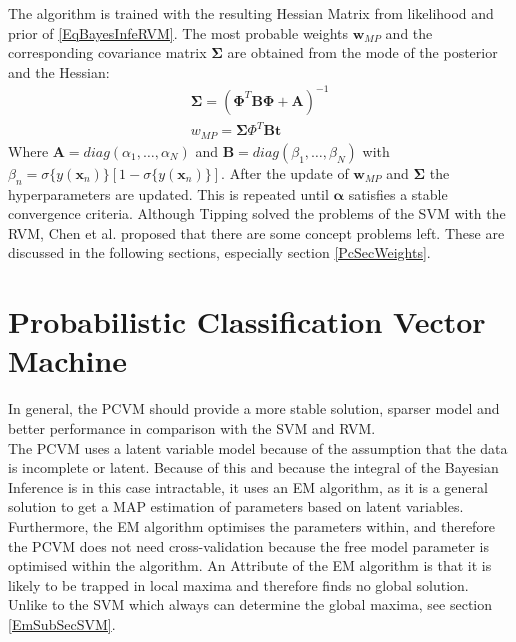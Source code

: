The algorithm is trained with the resulting Hessian Matrix from likelihood and prior of \ref{EqBayesInfeRVM}.
The most probable weights $\mathbf{w}_{MP}$ and the corresponding covariance matrix $\boldsymbol{\Sigma}$ are obtained from the mode of the posterior and the Hessian:
\begin{equation}
	\begin{split}
		\boldsymbol{\Sigma} = (\boldsymbol{\Phi}^T\mathbf{B}\boldsymbol{\Phi} + \mathbf{A})^{-1}\\
		w_{MP}=\boldsymbol{\Sigma}\Phi^T\mathbf{B}\mathbf{t} 
	\end{split}
\end{equation}
Where $\mathbf{A} = diag(\alpha_1,\dots,\alpha_N)$ and $\mathbf{B} = diag(\beta_1,\dots,\beta_N)$ with $\beta_n =\sigma\{y(\mathbf{x}_n)\}[1-\sigma\{y(\mathbf{x}_n)\}]$.
After the update of $\mathbf{w}_{MP}$ and $\boldsymbol{\Sigma}$ the hyperparameters are updated.
This is repeated until $\boldsymbol{\alpha}$ satisfies a stable convergence criteria.\cite[p. 219]{Tipping.2001}\newline
Although Tipping solved the problems of the \ac{SVM} with the \ac{RVM}, Chen et al. proposed that there are some concept problems left.\cite{Chen.2009}
These are discussed in the following sections, especially section \ref{PcSecWeights}.
\section{Probabilistic Classification Vector Machine}\label{PcSecAdvan}
In general, the \acf{PCVM} should provide a more stable solution, sparser model and better performance in comparison with the \acs{SVM} and \acs{RVM}.\cite{Chen.2009}\\
The \ac{PCVM} uses a latent variable model because of the assumption that the data is incomplete or latent.
Because of this and because the integral of the Bayesian Inference is in this case intractable, it uses an \ac{EM} algorithm, as it is a general solution to get a \ac{MAP} estimation of parameters based on latent variables.
Furthermore, the \acs{EM} algorithm optimises the parameters within, and therefore the \ac{PCVM} does not need cross-validation because the free model parameter is optimised within the algorithm.\cite{Chen.2009}\newline
An Attribute of the \acs{EM} algorithm is that it is likely to be trapped in local maxima and therefore finds no global solution.\cite{YiWang.2006}
Unlike to the \acs{SVM} which always can determine the global maxima, see section \ref{EmSubSecSVM}.\newline

